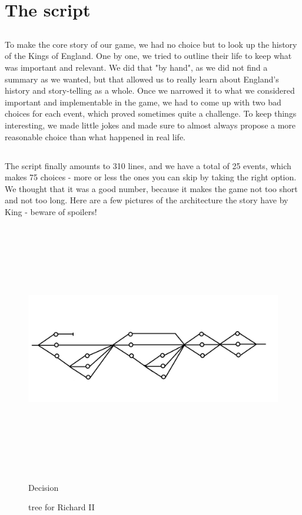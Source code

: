 \documentclass{scrreprt}
\begin{document}
\section{The script}

\subsection*{} To make the core story of our game, we had no choice but to look up the history of the Kings of England. One by one, we tried to outline their life to keep what was important and relevant. We did that "by hand", as we did not find a summary as we wanted, but that allowed us to really learn about England's history and story-telling as a whole. Once we narrowed it to what we considered important and implementable in the game, we had to come up with two bad choices for each event, which proved sometimes quite a challenge. To keep things interesting, we made little jokes and made sure to almost always propose a more reasonable choice than what happened in real life.

\subsection*{} The script finally amounts to 310 lines, and we have a total of 25 events, which makes 75 choices - more or less the ones you can skip by taking the right option. We thought that it was a good number, because it makes the game not too short and not too long. Here are a few pictures of the architecture the story have by King - beware of spoilers!

\begin{figure}[position]
	\includegraphics[width=15cm, height=11cm]{trees/Richard2.jpg}
	\begin{center}
		Decision 
	\end{center}tree for Richard II
\end{figure}
\end{document}
